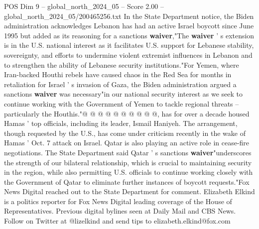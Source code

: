 \begin{textsample}{POS Dim 9 – global\_north\_2024\_05 – Score 2.00 – global\_north\_2024\_05/200465256.txt}
In the State Department notice, the Biden administration acknowledges Lebanon has had an active Israel boycott since June 1995 but added as its reasoning for a sanctions \textbf{waiver},"The \textbf{waiver} ' s extension is in the U.S. national interest as it facilitates U.S. support for Lebanese stability, sovereignty, and efforts to undermine violent extremist influences in Lebanon and to strengthen the ability of Lebanese security institutions."For Yemen, where Iran-backed Houthi rebels have caused chaos in the Red Sea for months in retaliation for Israel ' s invasion of Gaza, the Biden administration argued a sanctions \textbf{waiver} was necessary"in our national security interest as we seek to continue working with the Government of Yemen to tackle regional threats -- particularly the Houthis."@ @ @ @ @ @ @ @ @ @, has for over a decade housed Hamas ' top officials, including its leader, Ismail Haniyeh.
The arrangement, though requested by the U.S., has come under criticism recently in the wake of Hamas ' Oct. 7 attack on Israel.
Qatar is also playing an active role in cease-fire negotiations.
The State Department said Qatar ' s sanctions \textbf{waiver}"underscores the strength of our bilateral relationship, which is crucial to maintaining security in the region, while also permitting U.S. officials to continue working closely with the Government of Qatar to eliminate further instances of boycott requests."Fox News Digital reached out to the State Department for comment.
Elizabeth Elkind is a politics reporter for Fox News Digital leading coverage of the House of Representatives.
Previous digital bylines seen at Daily Mail and CBS News.
Follow on Twitter at @lizelkind and send tips to elizabeth.elkind@fox.com

\end{textsample}

